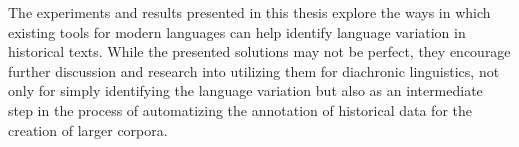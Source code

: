 The experiments and results presented in this thesis explore the ways in which existing tools for modern languages can help identify language variation in historical texts. While the presented solutions may not be perfect, they encourage further discussion and research into utilizing them for diachronic linguistics, not only for simply identifying the language variation but also as an intermediate step in the process of automatizing the annotation of historical data for the creation of larger corpora. 